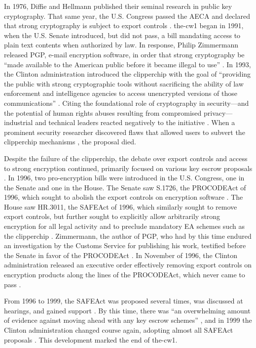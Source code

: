 In 1976, Diffie and Hellmann published their seminal research in public key cryptography. That same year, the U.S.
Congress passed the \ac{AECA} and declared that strong cryptography is subject to export controls
\cite{kehl_right_2015}. \Ac{the-cw1} began in 1991, when the U.S. Senate introduced, but did not pass, a bill mandating
access to plain text contents when authorized by law. In response, Philip Zimmermann released \ac{PGP}, e-mail
encryption software, in order that strong cryptography be ``made available to the American public before it became
illegal to use'' \cite{zimmermann_1996}. In 1993, the Clinton administration introduced the \ac{clipperchip}
\cite{press_1993} with the goal of ``providing the public with strong cryptographic tools without sacrificing the
ability of law enforcement and intelligence agencies to access unencrypted versions of those communications''
\cite{thompson_2015}. Citing the foundational role of cryptography in security---and the potential of human rights
abuses resulting from compromised privacy---industrial and technical leaders reacted negatively to the initiative
\cite{kehl_right_2015} \cite{zimmermann_1996}. When a prominent security researcher discovered flaws that allowed users
to subvert the \ac{clipperchip} mechanisms \cite{blaze_protocol_1994}, the proposal died.

Despite the failure of the \ac{clipperchip}, the debate over export controls and access to strong encryption continued,
primarily focused on various key escrow proposals \cite{thompson_2015}. In 1996, two pro-encryption bills were
introduced in the U.S. Congress, one in the Senate and one in the House. The Senate saw S.1726, the \ac{PROCODEAct} of
1996, which sought to abolish the export controls on encryption software \cite{burns_s1726_1996}. The House saw HR.3011,
the \ac{SAFEAct} of 1996, which similarly sought to remove export controls, but further sought to explicitly allow
arbitrarily strong encryption for all legal activity and to preclude mandatory \ac{EA} schemes such as the
\ac{clipperchip} \cite{goodlatte_hr3011_1996}. Zimmermann, the author of PGP, who had by this time endured an
investigation by the Customs Service for publishing his work, testified before the Senate in favor of the
\ac{PROCODEAct} \cite{zimmermann_1996}. In November of 1996, the Clinton administration released an executive order
effectively removing export controls on encryption products along the lines of the \ac{PROCODEAct}, which never came to
pass \cite{clinton_1996}.

From 1996 to 1999, the \ac{SAFEAct} was proposed several times, was discussed at hearings, and gained support
\cite{kehl_right_2015}. By this time, there was ``an overwhelming amount of evidence against moving ahead with any key
escrow schemes'' \cite{thompson_2015}, and in 1999 the Clinton administration changed course again, adopting almost all
\ac{SAFEAct} proposals \cite{kehl_right_2015}. This development marked the end of \ac{the-cw1}.

